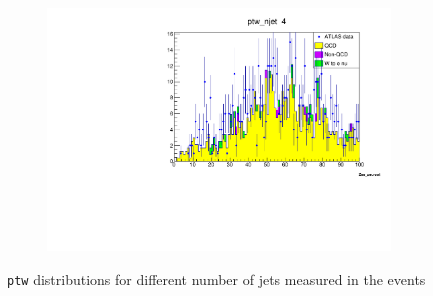 \begin{figure}
\begin{subfigure}{0.5\textwidth}
            \includegraphics[width=\textwidth]{../W_mass/ptw_njet4.pdf}
        \end{subfigure}
        \caption{\texttt{ptw} distributions for different number of jets measured in the events}
        \label{fig:ptw_jets}
    \end{figure}
    
